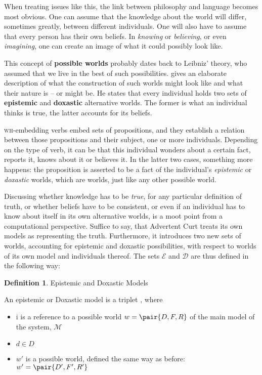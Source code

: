 \documentclass[notitlepage,twoside,a4paper]{scrreprt}
\newcommand{\term}[1]{\textsf{\textbf{#1}}} %
\newcommand{\pn}{\textsf} %
\newcommand{\wh}{\textsc{wh}}
\newcommand{\acurt}{\pn{Advertent Curt}}
\theoremstyle{remark}
\theoremstyle{remark}
\theoremstyle{definition}
\newtheorem{definition}[thm]{Definition}
\theoremstyle{definition}
\begin{document}
When treating issues like this, the link between philosophy and language becomes
most obvious. One can assume that the knowledge about the world will differ,
sometimes greatly, between different individuals. One will also have to assume
that every person has their own beliefs. In \emph{knowing} or \emph{believing},
or even \emph{imagining}, one can create an image of what it could possibly look
like.

This concept of \term{possible worlds} probably dates back to Leibniz' theory,
who assumed that we live in the best of such possibilities. \cite{lewis} gives
an elaborate description of what the construction of such worlds might look like
and what their nature is -- or might be. He states that every individual
holds two sets of \term{epistemic} and \term{doxastic} alternative worlds. The
former is what an individual thinks is true, the latter accounts for its
beliefs.

\wh-embedding verbs embed sets of propositions, and they establish a relation
between those propositions and their subject, one or more individuals. Depending
on the type of verb, it can be that this individual wonders about a certain
fact, reports it,  knows about it or believes it. In the latter two cases,
something more happens: the proposition is asserted to be a fact of the
individual's \emph{epistemic} or \emph{doxastic} worlds, which are worlds, just
like any other possible world.

Discussing whether knowledge has to be \emph{true}, for any particular
definition of truth, or whether beliefs have to be consistent, or even if an
individual has to know about itself in its own alternative worlds, is a moot
point from a computational perspective. Suffice to say, that \acurt{} treats its
own models as representing the truth. Furthermore, it introduces two new sets of
worlds, accounting for epistemic and doxastic possibilities, with respect to
worlds of its own model and individuals thereof. The sets $\mathcal{E}$ and
$\mathcal{D}$ are thus defined in the following way:

\begin{definition}
  Epistemic and Doxastic Models

  An epistemic or Doxastic model is a triplet , where
  \begin{itemize}
    \item i is a reference to a possible world $w = \pair{D,F,R}$ of the main
    model of the system, $\mathcal{M}$
    \item $d \in D$
    \item $w'$ is a possible world, defined the same way as before: $w' =
    \pair{D',F',R'}$
  \end{itemize}
\end{definition}
\end{document}
